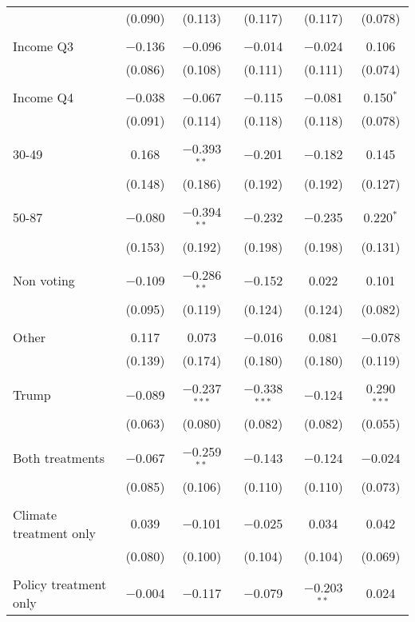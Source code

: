 \begin{tabular}{@{\extracolsep{5pt}}lccccc}
  & (0.090) & (0.113) & (0.117) & (0.117) & (0.078) \\ 
  & & & & & \\ 
 Income Q3 & $-$0.136 & $-$0.096 & $-$0.014 & $-$0.024 & 0.106 \\ 
  & (0.086) & (0.108) & (0.111) & (0.111) & (0.074) \\ 
  & & & & & \\ 
 Income Q4 & $-$0.038 & $-$0.067 & $-$0.115 & $-$0.081 & 0.150$^{*}$ \\ 
  & (0.091) & (0.114) & (0.118) & (0.118) & (0.078) \\ 
  & & & & & \\ 
 30-49 & 0.168 & $-$0.393$^{**}$ & $-$0.201 & $-$0.182 & 0.145 \\ 
  & (0.148) & (0.186) & (0.192) & (0.192) & (0.127) \\ 
  & & & & & \\ 
 50-87 & $-$0.080 & $-$0.394$^{**}$ & $-$0.232 & $-$0.235 & 0.220$^{*}$ \\ 
  & (0.153) & (0.192) & (0.198) & (0.198) & (0.131) \\ 
  & & & & & \\ 
 Non voting & $-$0.109 & $-$0.286$^{**}$ & $-$0.152 & 0.022 & 0.101 \\ 
  & (0.095) & (0.119) & (0.124) & (0.124) & (0.082) \\ 
  & & & & & \\ 
 Other & 0.117 & 0.073 & $-$0.016 & 0.081 & $-$0.078 \\ 
  & (0.139) & (0.174) & (0.180) & (0.180) & (0.119) \\ 
  & & & & & \\ 
 Trump & $-$0.089 & $-$0.237$^{***}$ & $-$0.338$^{***}$ & $-$0.124 & 0.290$^{***}$ \\ 
  & (0.063) & (0.080) & (0.082) & (0.082) & (0.055) \\ 
  & & & & & \\ 
 Both treatments & $-$0.067 & $-$0.259$^{**}$ & $-$0.143 & $-$0.124 & $-$0.024 \\ 
  & (0.085) & (0.106) & (0.110) & (0.110) & (0.073) \\ 
  & & & & & \\ 
 Climate treatment only & 0.039 & $-$0.101 & $-$0.025 & 0.034 & 0.042 \\ 
  & (0.080) & (0.100) & (0.104) & (0.104) & (0.069) \\ 
  & & & & & \\ 
 Policy treatment only & $-$0.004 & $-$0.117 & $-$0.079 & $-$0.203$^{**}$ & 0.024 \\ 

\end{tabular}
